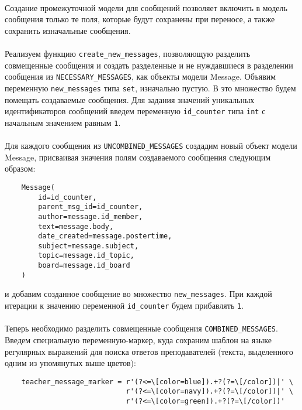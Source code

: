 \documentclass[12pt, a4paper, oneside]{article}
\begin{document}
\paragraph{}
Создание промежуточной модели для сообщений позволяет включить в модель сообщения только те поля, которые будут сохранены при переносе, а также сохранить изначальные сообщения.
\paragraph{}
Реализуем функцию \texttt{create\_new\_messages}, позволяющую разделить совмещенные сообщения и создать разделенные и не нуждавшиеся в разделении сообщения из \texttt{NECESSARY\_MESSAGES}, как объекты модели Message. Объявим переменную \texttt{new\_messages} типа \texttt{set}, изначально пустую. В это множество будем помещать создаваемые сообщения. Для задания значений уникальных идентификаторов сообщений введем переменную \texttt{id\_counter} типа \texttt{int} с начальным значением равным \texttt{1}.
\paragraph{}
Для каждого сообщения из \texttt{UNCOMBINED\_MESSAGES} создадим новый объект модели Message, присваивая значения полям создаваемого сообщения следующим образом:
\begin{verbatim}
    Message(
        id=id_counter,
        parent_msg_id=id_counter,
        author=message.id_member,
        text=message.body,
        date_created=message.postertime,
        subject=message.subject,
        topic=message.id_topic,
        board=message.id_board
    )
\end{verbatim}
и добавим созданное сообщение во множество \texttt{new\_messages}. При каждой итерации к значению переменной \texttt{id\_counter} будем прибавлять \texttt{1}.
\paragraph{}
Теперь необходимо разделить совмещенные сообщения \texttt{COMBINED\_MESSAGES}. Введем специальную переменную-маркер, куда сохраним шаблон на языке регулярных выражений для поиска ответов преподавателей (текста, выделенного одним из упомянутых выше цветов):
\begin{verbatim}
    teacher_message_marker = r'(?<=\[color=blue]).+?(?=\[/color])|' \
                             r'(?<=\[color=navy]).+?(?=\[/color])|' \
                             r'(?<=\[color=green]).+?(?=\[/color])'
\end{verbatim}
\end{document}
